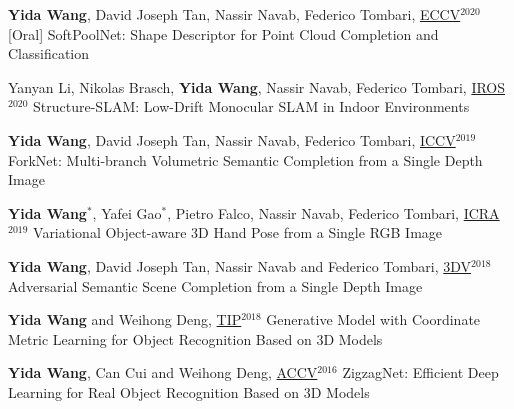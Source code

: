 \begin{cventries}
\begin{enumerate}[label={[\arabic*]}, leftmargin=*]
\item 
\cvpublication
{\textbf{Yida Wang}, David Joseph Tan, Nassir Navab, Federico Tombari, \underline{ECCV}$^{2020}$ [Oral] \href{https://www.youtube.com/watch?v=zw4NlyxWlBg}{}} %
{SoftPoolNet: Shape Descriptor for Point Cloud Completion and Classification} %
{} %
{} %

\item 
\cvpublication
{Yanyan Li, Nikolas Brasch, \textbf{Yida Wang}, Nassir Navab, Federico Tombari, \underline{IROS}$^{2020}$} %
{Structure-SLAM: Low-Drift Monocular SLAM in Indoor Environments} %
{} %
{} %

\item 
\cvpublication
{\textbf{Yida Wang}, David Joseph Tan, Nassir Navab, Federico Tombari, \underline{ICCV}$^{2019}$} %
{ForkNet: Multi-branch Volumetric Semantic Completion from a Single Depth Image} %
{} %
{} %

\item 
\cvpublication
{\textbf{Yida Wang}$^*$, Yafei Gao$^*$, Pietro Falco, Nassir Navab, Federico Tombari, \underline{ICRA}$^{2019}$ \href{https://www.youtube.com/watch?v=tSTQ2NTqB4A}{}} %
{Variational Object-aware 3D Hand Pose from a Single RGB Image} %
{} %
{} %

\item 
\cvpublication
{\textbf{Yida Wang}, David Joseph Tan, Nassir Navab and Federico Tombari, \underline{3DV}$^{2018}$ \href{https://www.youtube.com/watch?v=udvBhkupwXE&t=1s}{}} %
{Adversarial Semantic Scene Completion from a Single Depth Image} %
{} %
{} %

\item 
\cvpublication
{\textbf{Yida Wang} and Weihong Deng, \underline{TIP}$^{2018}$} %
{Generative Model with Coordinate Metric Learning for Object Recognition Based on 3D Models} %
{} %
{} %


\item 
\cvpublication
{\textbf{Yida Wang}, Can Cui and Weihong Deng, \underline{ACCV}$^{2016}$} %
{ZigzagNet: Efficient Deep Learning for Real Object Recognition Based on 3D Models} %
{} %
{} %



\end{enumerate}
\end{cventries}
